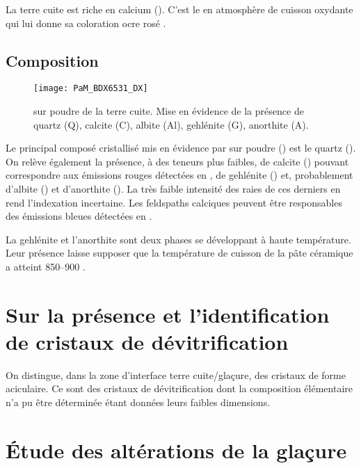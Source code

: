 La terre cuite est riche en calcium (). C'est 
le  en atmosphère de cuisson oxydante qui lui donne sa 
coloration ocre rosé \autocite{Echallier_1984}.

\subsection{Composition \cristallo}
\begin{figure}[htb]
  \texttt{[image: PaM\_BDX6531\_DX]}
  \caption[\ -- \DX sur poudre de la terre cuite]
          {\legendeA 
           \DX sur poudre de la terre cuite. 
           Mise en évidence de la présence de quartz (Q), calcite (C), 
           albite (Al), gehlénite (G), anorthite (A).}
  \label{DRX:6531}
\end{figure}

Le principal composé cristallisé mis en évidence par \DX sur poudre () est le quartz (). On relève également la présence, à des teneurs plus faibles, de calcite () pouvant correspondre aux émissions rouges détectées en \CL, de gehlénite () et, probablement d'albite () et d'anorthite (). La très faible intensité des raies de ces derniers en rend l'indexation incertaine. Les feldspaths calciques peuvent être responsables des émissions bleues détectées en \CL.

La gehlénite et l'anorthite sont deux phases se développant à 
haute température. Leur présence laisse supposer que la température 
de cuisson de la pâte céramique a atteint 
\SIrange[range-phrase=\ à\ ]{850}{900}{\degC} \autocite{Peters_1978}.


\section{Sur la présence et l'identification de cristaux de 
         dévitrification}

On distingue, dans la zone d'interface terre cuite/glaçure, des 
cristaux de forme aciculaire. Ce sont des cristaux de dévitrification 
dont la composition élémentaire n'a pu être déterminée étant données 
leurs faibles dimensions.


\section{Étude des altérations de la glaçure}

